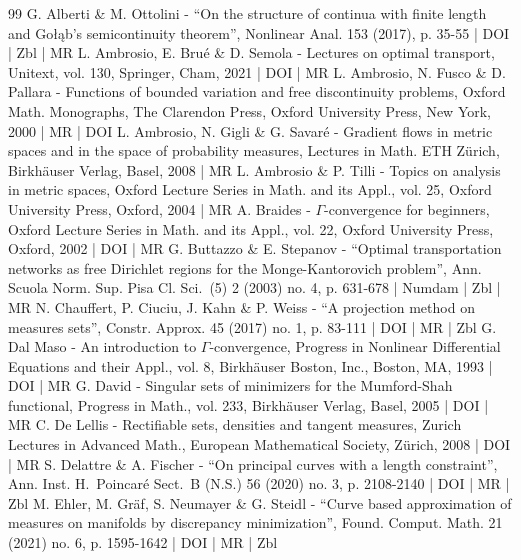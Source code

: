 \documentclass[10pt]{amsart}
\theoremstyle{definition}
\begin{document}
\begin{thebibliography}{99}
G. Alberti \& M. Ottolini - “On the structure of continua with finite length and Gołąb’s semicontinuity theorem”, Nonlinear Anal. 153 (2017), p. 35-55 | DOI | Zbl | MR
L. Ambrosio, E. Brué \& D. Semola - Lectures on optimal transport, Unitext, vol. 130, Springer, Cham, 2021 | DOI | MR
L. Ambrosio, N. Fusco \& D. Pallara - Functions of bounded variation and free discontinuity problems, Oxford Math. Monographs, The Clarendon Press, Oxford University Press, New York, 2000 | MR | DOI
L. Ambrosio, N. Gigli \& G. Savaré - Gradient flows in metric spaces and in the space of probability measures, Lectures in Math. ETH Zürich, Birkhäuser Verlag, Basel, 2008 | MR
L. Ambrosio \& P. Tilli - Topics on analysis in metric spaces, Oxford Lecture Series in Math. and its Appl., vol. 25, Oxford University Press, Oxford, 2004 | MR
A. Braides - $\Gamma $-convergence for beginners, Oxford Lecture Series in Math. and its Appl., vol. 22, Oxford University Press, Oxford, 2002 | DOI | MR
G. Buttazzo \& E. Stepanov - “Optimal transportation networks as free Dirichlet regions for the Monge-Kantorovich problem”, Ann. Scuola Norm. Sup. Pisa Cl. Sci. (5) 2 (2003) no. 4, p. 631-678 | Numdam | Zbl | MR
N. Chauffert, P. Ciuciu, J. Kahn \& P. Weiss - “A projection method on measures sets”, Constr. Approx. 45 (2017) no. 1, p. 83-111 | DOI | MR | Zbl
G. Dal Maso - An introduction to $\Gamma $-convergence, Progress in Nonlinear Differential Equations and their Appl., vol. 8, Birkhäuser Boston, Inc., Boston, MA, 1993 | DOI | MR
G. David - Singular sets of minimizers for the Mumford-Shah functional, Progress in Math., vol. 233, Birkhäuser Verlag, Basel, 2005 | DOI | MR
C. De Lellis - Rectifiable sets, densities and tangent measures, Zurich Lectures in Advanced Math., European Mathematical Society, Zürich, 2008 | DOI | MR
S. Delattre \& A. Fischer - “On principal curves with a length constraint”, Ann. Inst. H. Poincaré Sect. B (N.S.) 56 (2020) no. 3, p. 2108-2140 | DOI | MR | Zbl
M. Ehler, M. Gräf, S. Neumayer \& G. Steidl - “Curve based approximation of measures on manifolds by discrepancy minimization”, Found. Comput. Math. 21 (2021) no. 6, p. 1595-1642 | DOI | MR | Zbl

\end{thebibliography}
\end{document}

